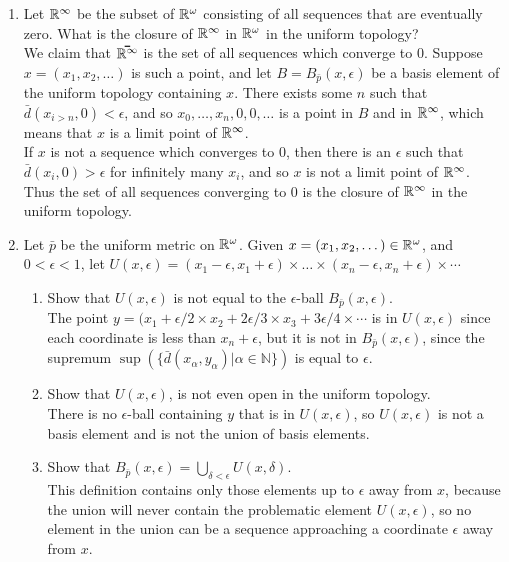 \documentclass[12pt,letterpaper]{article}
\begin{document}
\begin{enumerate}
\begin{enumerate}
  \end{enumerate}
  \item Let $\mathbb{R}^\infty$ be the subset of $\mathbb{R}^\omega$ consisting of all sequences that are eventually zero. What is the closure of $\mathbb{R}^\infty$ in $\mathbb{R}^\omega$ in the uniform topology? \\
  We claim that $\bar{\R^\infty}$ is the set of all sequences which converge to $0$.  Suppose $x=(x_1,x_2,\dots)$ is such a point, and let $B=B_{\bar{p}}(x,\epsilon)$ be a basis element of the uniform topology containing $x$. There exists some $n$ such that $\bar{d}(x_{i>n},0)<\epsilon$, and so $x_0,\dots,x_n,0,0,\dots$ is a point in $B$ and in $\mathbb{R}^{\infty}$, which means that $x$ is a limit point of $\mathbb{R}^\infty$.\\
  If $x$ is not a sequence which converges to $0$, then there is an $\epsilon$ such that $\bar{d}(x_i,0)>\epsilon$ for infinitely many $x_i$, and so $x$ is not a limit point of $\mathbb{R}^\infty$. Thus the set of all sequences converging to 0 is the closure of $\mathbb{R}^\infty$ in the uniform topology.
  \item Let $\bar{p}$ be the uniform metric on $\mathbb{R}^\omega$. Given $x = (x_1, x_2, \dots) \in \mathbb{R}^\omega$, and $0<\epsilon < 1$, let $U(x,\epsilon) = (x_1 - \epsilon, x_1+\epsilon) \times \dots \times (x_n-\epsilon, x_n+\epsilon)\times \cdots$
  \begin{enumerate}
    \item Show that $U(x,\epsilon)$ is not equal to the $\epsilon$-ball $B_{\bar{p}}(x,\epsilon)$. \\
    The point $y=(x_1+\epsilon/2 \times x_2+2\epsilon/3 \times x_3+3\epsilon/4\times\cdots$ is in $U(x,\epsilon)$ since each coordinate is less than $x_n+\epsilon$, but it is not in $B_{\bar{p}}(x,\epsilon)$, since the supremum $\sup(\{\bar{d}(x_\alpha, y_\alpha) | \alpha \in \mathbb{N}\})$ is equal to $\epsilon$.
    \item Show that $U(x,\epsilon)$, is not even open in the uniform topology. \\
    There is no $\epsilon$-ball containing $y$ that is in $U(x,\epsilon)$, so $U(x,\epsilon)$ is not a basis element and is not the union of basis elements.
    \item Show that $B_{\bar{p}}(x,\epsilon) = \displaystyle\bigcup_{\delta<\epsilon}U(x,\delta)$. \\
    This definition contains only those elements up to $\epsilon$ away from $x$, because the union will never contain the problematic element $U(x,\epsilon)$, so no element in the union can be a sequence approaching a coordinate $\epsilon$ away from $x$.

\end{enumerate}
\end{enumerate}
\end{document}

